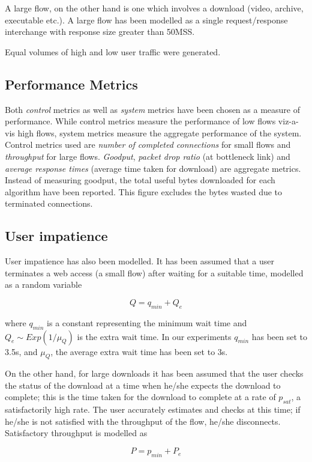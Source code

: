 \documentclass[conference]{../../IEEEtran}
\begin{document}
A large flow, on the other hand is one which involves a download (video, archive, executable etc.). A large flow has been modelled as a single request/response interchange with response size greater than 50MSS. 

Equal volumes of high and low user traffic were generated.
\subsection{Performance Metrics}
Both \emph{control} metrics as well as \emph{system} metrics have been chosen as a measure of performance. While control metrics measure the performance of low flows viz-a-vis high flows, system metrics measure the aggregate performance of the system. Control metrics used are \emph{number of completed connections} for small flows and \emph{throughput} for large flows. \emph{Goodput}, \emph{packet drop ratio} (at bottleneck link) and \emph{average response times} (average time taken for download) are aggregate metrics. Instead of measuring goodput, the total useful bytes downloaded for each algorithm have been reported. This figure excludes the bytes wasted due to terminated connections.


\subsection{User impatience}
User impatience has also been modelled. It has been assumed that a user terminates a web access (a small flow) after waiting for a suitable time, modelled as a random variable

\[
Q = q_{min} + Q_e
\]

where $q_{min}$ is a constant representing the minimum wait time and $Q_e \sim Exp(1/\mu_Q) $ is the extra wait time. In our experiments $q_{min}$ has been set to 3.5s, and $\mu_Q$, the average extra wait time has been set to 3s.

On the other hand, for large downloads it has been assumed that the user checks the status of the download at a time when he/she expects the download to complete; this is the time taken for the download to complete at a rate of $p_{sat}$, a satisfactorily high rate. The user accurately estimates and checks at this time; if he/she is not satisfied with the throughput of the flow, he/she disconnects. Satisfactory throughput is modelled as 

\[
P = p_{min} + P_e
\]
\end{document}
